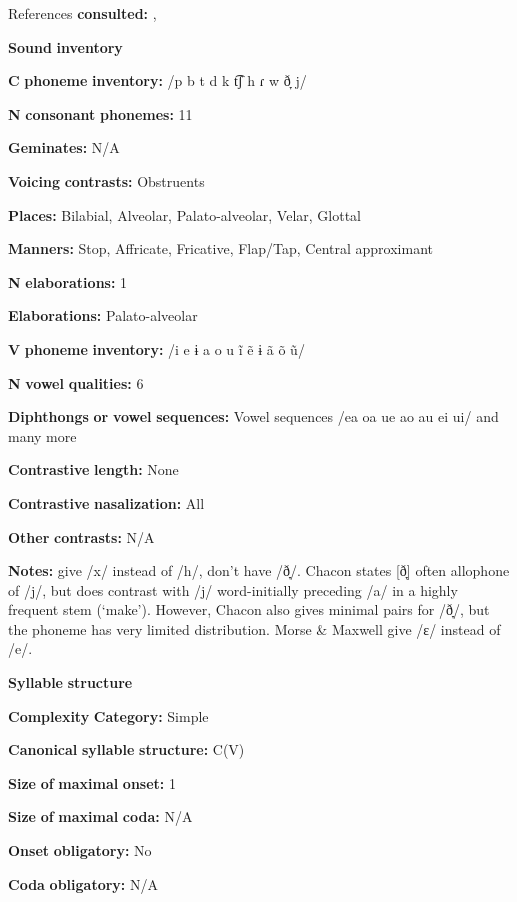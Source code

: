 \begin{styleBody}
References \textbf{consulted:} \citet{Chacon2012}, \citet{MorseMaxwell1999}

\textbf{Sound} \textbf{inventory}

\textbf{C} \textbf{phoneme} \textbf{inventory:} /p b t d k t͡ʃ h ɾ w ð̞ j/

\textbf{N} \textbf{consonant} \textbf{phonemes:} 11

\textbf{Geminates:} N/A

\textbf{Voicing} \textbf{contrasts:} Obstruents

\textbf{Places:} Bilabial, Alveolar, Palato-alveolar, Velar, Glottal

\textbf{Manners:} Stop, Affricate, Fricative, Flap/Tap, Central approximant

\textbf{N} \textbf{elaborations:} 1

\textbf{Elaborations:} Palato-alveolar

\textbf{V} \textbf{phoneme} \textbf{inventory:} /i e ɨ a o u ĩ ẽ ɨ ã õ ũ/

\textbf{N} \textbf{vowel} \textbf{qualities:} 6

\textbf{Diphthongs} \textbf{or} \textbf{vowel} \textbf{sequences:} Vowel sequences /ea oa ue ao au ei ui/ and many more

\textbf{Contrastive} \textbf{length:} None

\textbf{Contrastive} \textbf{nasalization:} All

\textbf{Other} \textbf{contrasts:} N/A

\textbf{Notes:} \citet{MorseMaxwell1999} give /x/ instead of /h/, don’t have /ð̞/. Chacon states [ð̞] often allophone of /j/, but does contrast with /j/ word-initially preceding /a/ in a highly frequent stem (‘make’). However, Chacon also gives minimal pairs for /ð̞/, but the phoneme has very limited distribution. Morse \& Maxwell give /ɛ/ instead of /e/.

\textbf{Syllable} \textbf{structure}

\textbf{Complexity} \textbf{Category:} Simple

\textbf{Canonical} \textbf{syllable} \textbf{structure:} C(V) \citep[163-7]{Chacon2012}

\textbf{Size} \textbf{of} \textbf{maximal} \textbf{onset:} 1

\textbf{Size} \textbf{of} \textbf{maximal} \textbf{coda:} N/A

\textbf{Onset} \textbf{obligatory:} No

\textbf{Coda} \textbf{obligatory:} N/A


\end{styleBody}
